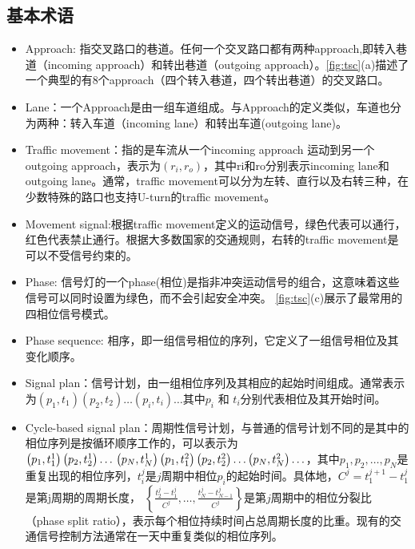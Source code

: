 \subsection{基本术语}
\begin{itemize}
    \item Approach: 指交叉路口的巷道。任何一个交叉路口都有两种approach,即转入巷道（incoming approach）和转出巷道（outgoing approach）。\autoref{fig:tsc}(a)描述了一个典型的有8个approach（四个转入巷道，四个转出巷道）的交叉路口。
    \item Lane：一个Approach是由一组车道组成。与Approach的定义类似，车道也分为两种：转入车道（incoming lane）和转出车道(outgoing lane)。
    \item Traffic movement：指的是车流从一个incoming approach 运动到另一个outgoing approach，表示为$\left(r_{i}, r_{o}\right)$，其中ri和ro分别表示incoming lane和outgoing lane。通常，traffic movement可以分为左转、直行以及右转三种，在少数特殊的路口也支持U-turn的traffic movement。
    \item Movement signal:根据traffic movement定义的运动信号，绿色代表可以通行，红色代表禁止通行。根据大多数国家的交通规则，右转的traffic movement是可以不受信号约束的。
    \item Phase: 信号灯的一个phase(相位)是指非冲突运动信号的组合，这意味着这些信号可以同时设置为绿色，而不会引起安全冲突。 \autoref{fig:tsc}(c)展示了最常用的四相位信号模式。
    \item Phase sequence: 相序，即一组信号相位的序列，它定义了一组信号相位及其变化顺序。
    \item Signal plan：信号计划，由一组相位序列及其相应的起始时间组成。通常表示为$\left(p_{1}, t_{1}\right)\left(p_{2}, t_{2}\right) \ldots\left(p_{i}, t_{i}\right) \ldots$其中$p_{i}$ 和 $t_{i}$分别代表相位及其开始时间。
    \item Cycle-based signal plan：周期性信号计划，与普通的信号计划不同的是其中的相位序列是按循环顺序工作的，可以表示为
    $\left(p_{1}, t_{1}^{1}\right)\left(p_{2}, t_{2}^{1}\right) \ldots \\ \left(p_{N}, t_{N}^{1}\right)\left(p_{1}, t_{1}^{2}\right)\left(p_{2}, t_{2}^{2}\right) \ldots\left(p_{N}, t_{N}^{2}\right) \ldots$，其中$p_{1}, p_{2}, \ldots, p_{N}$是重复出现的相位序列，$t_i^j$是$j$周期中相位$p_i$的起始时间。具体地，$C^{j}=t_{1}^{j+1}-t_{1}^{j}$是第j周期的周期长度， $\left\{\frac{t_{2}^j-t_{1}^j}{C^j}, \ldots, \frac{t_{N}^j-t_{N-1}^j}{C^j}\right\}$是第$j$周期中的相位分裂比（phase split ratio），表示每个相位持续时间占总周期长度的比重。现有的交通信号控制方法通常在一天中重复类似的相位序列。
\end{itemize}


